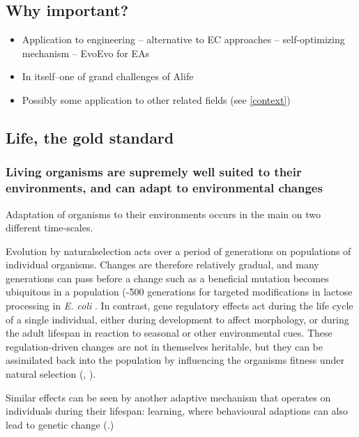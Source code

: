 \subsection{Why important?}\label{why-important}

\begin{itemize}
	\item Application to engineering -- alternative to EC approaches -- self-optimizing mechanism -- EvoEvo for EAs
	\item In itself--one of grand challenges of Alife \autocite{Bedau:2000mi}
	\item Possibly some application to other related fields (see \cref{context})
\end{itemize}

\subsection{Life, the gold standard}

\subsubsection{Living organisms are supremely well suited to their environments, and can adapt to environmental changes}
\label{living-organisms-are-supremely-well-suited-to-their-environments-and-can-adapt-to-environmental-changes}

Adaptation of organisms to their environments occurs in the main on two
different time-scales.

Evolution by \gls{naturalselection} acts over a period of generations on
populations of individual organisms. Changes are therefore relatively
gradual, and many generations can pass before a change such as a
beneficial mutation becomes ubiquitous in a population (-500
generations for targeted modifications in lactose processing in
\emph{E. coli} \autocite{Dekel:2005fk}. In contrast, gene regulatory
effects act during the life cycle of a single individual, either during
development to affect morphology, or during the adult lifespan in
reaction to seasonal or other environmental cues. These
regulation-driven changes are not in themselves heritable, but they can
be assimilated back into the population by influencing the organisms
fitness under natural selection (\eg,
\autocite{Baldwin:1896ly,Dennett:2003ve,Paenke:2009xe,Paenke:2007ve}).

Similar effects can be seen by another adaptive mechanism that operates
on individuals during their lifespan: learning, where behavioural
adaptions can also lead to genetic change
(\eg \autocite{Hinton:1987vy}.)

